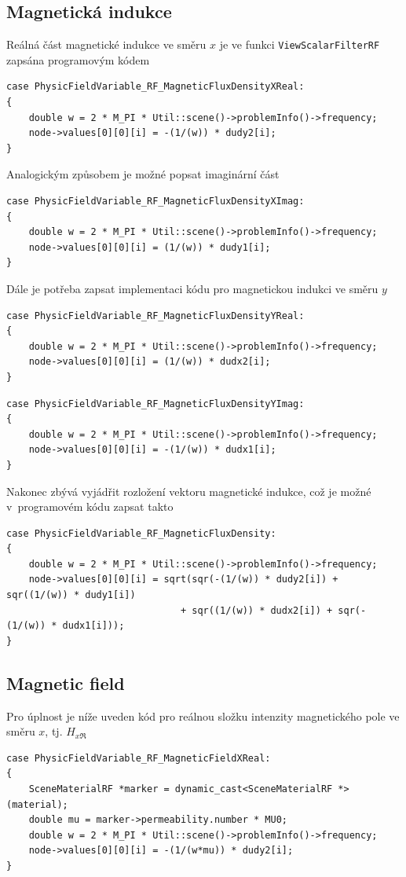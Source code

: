 \subsection*{Magnetická indukce}
Reálná část magnetické indukce ve směru $x$ je ve funkci \texttt{ViewScalarFilterRF} zapsána programovým kódem
\begin{verbatim}
case PhysicFieldVariable_RF_MagneticFluxDensityXReal:
{
    double w = 2 * M_PI * Util::scene()->problemInfo()->frequency;
    node->values[0][0][i] = -(1/(w)) * dudy2[i];
}
\end{verbatim}
Analogickým způsobem je možné popsat imaginární část
\begin{verbatim}
case PhysicFieldVariable_RF_MagneticFluxDensityXImag:
{
    double w = 2 * M_PI * Util::scene()->problemInfo()->frequency;
    node->values[0][0][i] = (1/(w)) * dudy1[i];
}    
\end{verbatim}
Dále je potřeba zapsat implementaci kódu pro magnetickou indukci ve směru $y$
\begin{verbatim}
case PhysicFieldVariable_RF_MagneticFluxDensityYReal:
{
    double w = 2 * M_PI * Util::scene()->problemInfo()->frequency;
    node->values[0][0][i] = (1/(w)) * dudx2[i];
}
\end{verbatim}
\begin{verbatim}
case PhysicFieldVariable_RF_MagneticFluxDensityYImag:
{
    double w = 2 * M_PI * Util::scene()->problemInfo()->frequency;
    node->values[0][0][i] = -(1/(w)) * dudx1[i];
}
\end{verbatim}
Nakonec zbývá vyjádřit rozložení vektoru magnetické indukce, což je možné v~programovém kódu zapsat takto
\begin{verbatim}
case PhysicFieldVariable_RF_MagneticFluxDensity:
{
    double w = 2 * M_PI * Util::scene()->problemInfo()->frequency;
    node->values[0][0][i] = sqrt(sqr(-(1/(w)) * dudy2[i]) + sqr((1/(w)) * dudy1[i])
                               + sqr((1/(w)) * dudx2[i]) + sqr(-(1/(w)) * dudx1[i]));
}
\end{verbatim}

\subsection*{Magnetic field}
Pro úplnost je níže uveden kód pro reálnou složku intenzity magnetického pole ve směru $x$, tj. $H_{x\Re}$
\begin{verbatim}
case PhysicFieldVariable_RF_MagneticFieldXReal:
{
    SceneMaterialRF *marker = dynamic_cast<SceneMaterialRF *>(material);
    double mu = marker->permeability.number * MU0;
    double w = 2 * M_PI * Util::scene()->problemInfo()->frequency;
    node->values[0][0][i] = -(1/(w*mu)) * dudy2[i];
}
\end{verbatim}

